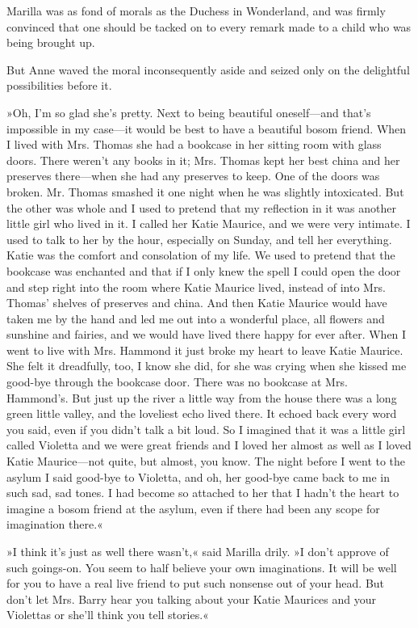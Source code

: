 Marilla was as fond of morals as the Duchess in Wonderland, and was firmly convinced that one should be tacked on to every remark made to a child who was being brought up.

But Anne waved the moral inconsequently aside and seized only on the delightful possibilities before it.

»Oh, I'm so glad she's pretty. Next to being beautiful oneself—and that's impossible in my case—it would be best to have a beautiful bosom friend. When I lived with Mrs. Thomas she had a bookcase in her sitting room with glass doors. There weren't any books in it; Mrs. Thomas kept her best china and her preserves there—when she had any preserves to keep. One of the doors was broken. Mr. Thomas smashed it one night when he was slightly intoxicated. But the other was whole and I used to pretend that my reflection in it was another little girl who lived in it. I called her Katie Maurice, and we were very intimate. I used to talk to her by the hour, especially on Sunday, and tell her everything. Katie was the comfort and consolation of my life. We used to pretend that the bookcase was enchanted and that if I only knew the spell I could open the door and step right into the room where Katie Maurice lived, instead of into Mrs. Thomas' shelves of preserves and china. And then Katie Maurice would have taken me by the hand and led me out into a wonderful place, all flowers and sunshine and fairies, and we would have lived there happy for ever after. When I went to live with Mrs. Hammond it just broke my heart to leave Katie Maurice. She felt it dreadfully, too, I know she did, for she was crying when she kissed me good-bye through the bookcase door. There was no bookcase at Mrs. Hammond's. But just up the river a little way from the house there was a long green little valley, and the loveliest echo lived there. It echoed back every word you said, even if you didn't talk a bit loud. So I imagined that it was a little girl called Violetta and we were great friends and I loved her almost as well as I loved Katie Maurice—not quite, but almost, you know. The night before I went to the asylum I said good-bye to Violetta, and oh, her good-bye came back to me in such sad, sad tones. I had become so attached to her that I hadn't the heart to imagine a bosom friend at the asylum, even if there had been any scope for imagination there.«

»I think it's just as well there wasn't,« said Marilla drily. »I don't approve of such goings-on. You seem to half believe your own imaginations. It will be well for you to have a real live friend to put such nonsense out of your head. But don't let Mrs. Barry hear you talking about your Katie Maurices and your Violettas or she'll think you tell stories.«

